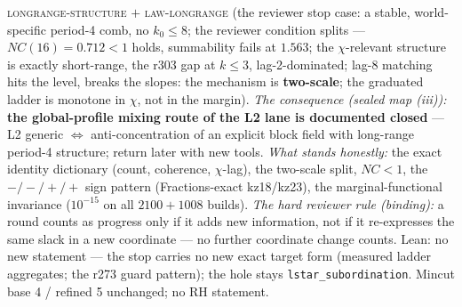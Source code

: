\documentclass[11pt,a4paper]{article}
\begin{document}
{\textsc{longrange-structure} $+$ \textsc{law-longrange} (the
reviewer stop case: a stable, world-specific period-4 comb, no
$k_0 \le 8$; the reviewer condition splits --- $NC(16) = 0.712 <
1$ holds, summability fails at $1.563$; the $\chi$-relevant
structure is exactly short-range, the r303 gap at $k \le 3$,
lag-2-dominated; lag-8 matching hits the level, breaks the slopes:
the mechanism is \textbf{two-scale}; the graduated ladder is
monotone in $\chi$, not in the margin).  \emph{The consequence
(sealed map (iii)):} \textbf{the global-profile mixing route of
the L2 lane is documented closed} --- L2 generic $\Leftrightarrow$
anti-concentration of an explicit block field with long-range
period-4 structure; return later with new tools.  \emph{What
stands honestly:} the exact identity dictionary (count, coherence,
$\chi$-lag), the two-scale split, $NC < 1$, the $-/-/+/+$ sign
pattern (Fractions-exact kz18/kz23), the marginal-functional
invariance ($10^{-15}$ on all $2100 + 1008$ builds).  \emph{The
hard reviewer rule (binding):} a round counts as progress only if
it adds new information, not if it re-expresses the same slack in
a new coordinate --- no further coordinate change counts.  Lean:
no new statement --- the stop carries no new exact target form
(measured ladder aggregates; the r273 guard pattern); the hole
stays \texttt{lstar\_subordination}.  Mincut base 4 / refined 5
unchanged; no RH statement.\par}
\end{document}
